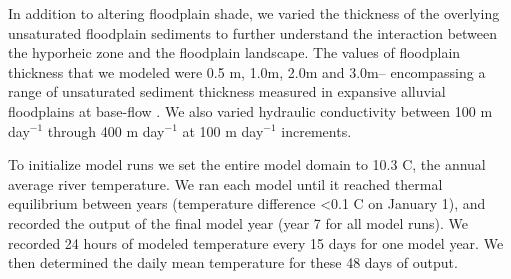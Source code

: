 \documentclass[letterpaper, 11pt]{article}
\begin{document}
In addition to altering floodplain shade, we varied the thickness of the overlying unsaturated floodplain sediments to further understand the interaction between the hyporheic zone and the floodplain landscape. The values of floodplain thickness that we modeled were 0.5 m, 1.0m, 2.0m and 3.0m-- encompassing a range of unsaturated sediment thickness measured in expansive alluvial floodplains at base-flow \parencite{Helton2012ScalingSystem, Munz2017CoupledDynamics}. We also varied hydraulic conductivity between 100 m day$^{-1}$ through 400 m day$^{-1}$ at 100 m day$^{-1}$ increments.

To initialize model runs we set the entire model domain to 10.3 C, the annual average river temperature. We ran each model until it reached thermal equilibrium between years (temperature difference \textless 0.1 C on January 1), and recorded the output of the final model year (year 7 for all model runs). We recorded 24 hours of modeled temperature every 15 days for one model year. We then determined the daily mean temperature for these 48 days  of output.  




\end{document}
